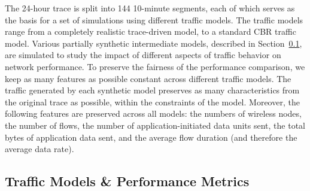 \documentclass[conference]{IEEEtran}
\newcommand{\caps}[1]{{\small{#1}}}
\begin{document}
The 24-hour trace is split into 144 10-minute segments, each of which serves as the basis for a set of simulations using different traffic models. The traffic models range from a completely realistic trace-driven model, to a standard \caps{CBR} traffic model. Various partially synthetic intermediate models, described in Section~\ref{sec:models-metrics}, are simulated to study the impact of different aspects of traffic behavior on network performance. To preserve the fairness of the performance comparison, we keep as many features as possible constant across different traffic models. The traffic generated by each synthetic model preserves as many characteristics from the original trace as possible, within the constraints of the model. Moreover, the following features are preserved across all models: the numbers of wireless nodes, the number of flows, the number of application-initiated data units sent, the total bytes of application data sent, and the average flow duration (and therefore the average data rate).

\subsection{Traffic Models \& Performance Metrics}\label{sec:models-metrics}
\end{document}
